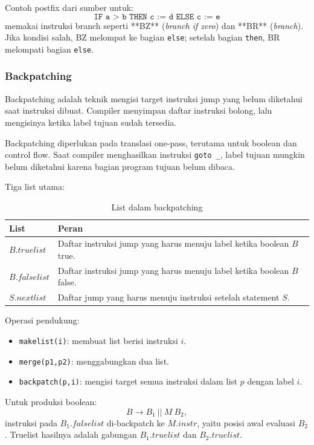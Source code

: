 Contoh postfix dari sumber untuk:
\[
    \texttt{IF a > b THEN c := d ELSE c := e}
\]
memakai instruksi branch seperti **BZ** (\textit{branch if zero}) dan **BR** (\textit{branch}). Jika kondisi salah, BZ melompat ke bagian \texttt{else}; setelah bagian \texttt{then}, BR melompati bagian \texttt{else}.

\subsubsection{Backpatching}

\begin{jawab}
Backpatching adalah teknik mengisi target instruksi jump yang belum diketahui saat instruksi dibuat. Compiler menyimpan daftar instruksi bolong, lalu mengisinya ketika label tujuan sudah tersedia.
\end{jawab}

Backpatching diperlukan pada translasi one-pass, terutama untuk boolean dan control flow. Saat compiler menghasilkan instruksi \texttt{goto \_}, label tujuan mungkin belum diketahui karena bagian program tujuan belum dibaca.

Tiga list utama:
\begin{table}[H]
\centering
\begin{tabularx}{\textwidth}{|L{0.22\textwidth}|X|}
\hline
\textbf{List} & \textbf{Peran} \\
\hline
$B.truelist$ & Daftar instruksi jump yang harus menuju label ketika boolean $B$ true. \\
\hline
$B.falselist$ & Daftar instruksi jump yang harus menuju label ketika boolean $B$ false. \\
\hline
$S.nextlist$ & Daftar jump yang harus menuju instruksi setelah statement $S$. \\
\hline
\end{tabularx}
\caption{List dalam backpatching}
\label{tab:list-backpatching}
\end{table}

Operasi pendukung:
\begin{itemize}
    \item \texttt{makelist(i)}: membuat list berisi instruksi $i$.
    \item \texttt{merge(p1,p2)}: menggabungkan dua list.
    \item \texttt{backpatch(p,i)}: mengisi target semua instruksi dalam list $p$ dengan label $i$.
\end{itemize}

Untuk produksi boolean:
\[
    B \rightarrow B_1\ ||\ M\ B_2,
\]
instruksi pada $B_1.falselist$ di-backpatch ke $M.instr$, yaitu posisi awal evaluasi $B_2$. Truelist hasilnya adalah gabungan $B_1.truelist$ dan $B_2.truelist$.

